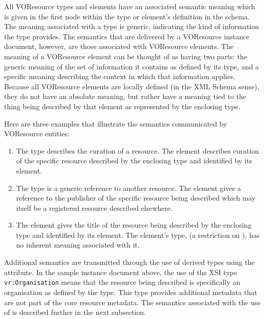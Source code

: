 \documentclass[11pt,a4paper]{ivoa}
\begin{document}
All VOResource types and elements have an associated semantic meaning
which is given in the first 
node within the type or element's definition in the schema.  The
meaning associated with a type is generic, indicating the kind of
information the type provides.  The semantics that are delivered by a
VOResource instance document, however, are those associated with
VOResource elements.  The meaning of a VOResource element can be
thought of as having two parts:  the generic meaning of the set of
information it contains as defined by its type, and a specific meaning
describing the context in which that information applies.  Because all
VOResource elements are locally defined (in the XML Schema
sense), they do not have an absolute meaning, but rather have a
meaning tied to the thing being described by that element as
represented by the enclosing type.

Here are three examples that illustrate the semantics communicated by
VOResource entities:

\begin{enumerate}
\item The  type describes the curation of a
       resource.  The  element
       describes curation of the specific resource described by the
       enclosing  type and identified by its
        element.

  \item The  type is a generic reference to
       another resource.  The  element
       gives a reference to the publisher of the specific resource being
       described which may itself be a registered resource described
       elsewhere.

  \item The  element gives the title of
       the resource being described by the enclosing
        type and identified by its
        element.  The
        element's type,
        (a restriction on
       ), has no inherent meaning associated
       with it.
\end{enumerate}


Additional semantics are transmitted through the use of derived types
using the  attribute.  In the sample instance document
above, the use of the XSI type \verb|vr:Organisation| means that the
resource being described is specifically an organisation as defined by
the  type.  This type provides additional
metadata that are not part of the core resource metadata.  The semantics
associated with the use of  is described further in the
next subsection.
\end{document}
